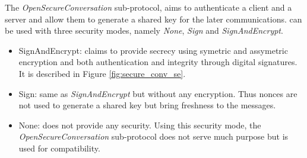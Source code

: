 The {\em OpenSecureConversation} sub-protocol, aims to authenticate a client and
a server and allow them to generate a shared key for the later communications.
\opcua can be used with three security modes, namely {\em None}, {\em Sign} and
{\em SignAndEncrypt}.

\begin{itemize}
    \item SignAndEncrypt: claims to provide secrecy using symetric and
    assymetric encryption and both authentication and integrity through digital
    signatures.
    It is described in Figure \ref{fig:secure_conv_se}.

    \item Sign: same as {\em SignAndEncrypt} but without any encryption.
    Thus nonces are not used to generate a shared key but bring freshness to the
    messages.

    \item None: does not provide any security.
    Using this security mode, the {\em OpenSecureConversation} sub-protocol does
    not serve much purpose but is used for compatibility.
\end{itemize}

